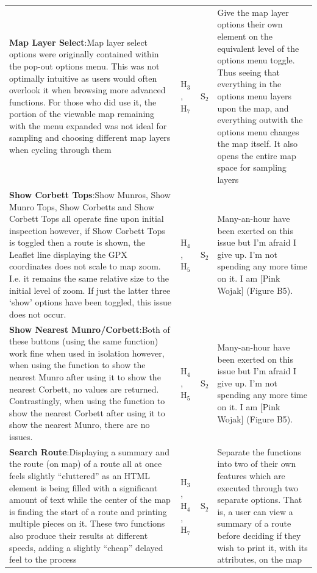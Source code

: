 \documentclass[11pt, english]{article}
\begin{document}
\begin{center}
\begin{longtable}{p{7.5cm}p{0.5cm}p{0.5cm}p{4cm}}
		\textbf{Map Layer Select}:\newline Map layer select options were originally contained within the pop-out options menu. This was not optimally intuitive as users would often overlook it when browsing more advanced functions. For those who did use it, the portion of the viewable map remaining with the menu expanded was not ideal for sampling and choosing different map layers when cycling through them & $\mathrm{H_{3}}$, $\mathrm{H_{7}}$ & $\mathrm{S_{2}}$ & Give the map layer options their own element on the equivalent level of the options menu toggle. Thus seeing that everything in the options menu layers upon the map, and everything outwith the options menu changes the map itself. It also opens the entire map space for sampling layers\\
		\textbf{Show Corbett Tops}:\newline Show Munros, Show Munro Tops, Show Corbetts and Show Corbett Tops all operate fine upon initial inspection however, if Show Corbett Tops is toggled then a route is shown, the Leaflet line displaying the GPX coordinates does not scale to map zoom. I.e. it remains the same relative size to the initial level of zoom. If just the latter three `show' options have been toggled, this issue does not occur. & $\mathrm{H_{4}}$, $\mathrm{H_{5}}$ & $\mathrm{S_{2}}$ & Many-an-hour have been exerted on this issue but I'm afraid I give up. I'm not spending any more time on it. I am [Pink Wojak] (Figure B5).\\
		\textbf{Show Nearest Munro/Corbett}:\newline Both of these buttons (using the same function) work fine when used in isolation however, when using the function to show the nearest Munro after using it to show the nearest Corbett, no values are returned. Contrastingly, when using the function to show the nearest Corbett after using it to show the nearest Munro, there are no issues. & $\mathrm{H_{4}}$, $\mathrm{H_{5}}$ & $\mathrm{S_{2}}$ & Many-an-hour have been exerted on this issue but I'm afraid I give up. I'm not spending any more time on it. I am [Pink Wojak] (Figure B5).\\
		\textbf{Search Route}:\newline Displaying a summary and the route (on map) of a route all at once feels slightly ``cluttered'' as an HTML element is being filled with a significant amount of text while the center of the map is finding the start of a route and printing multiple pieces on it. These two functions also produce their results at different speeds, adding a slightly ``cheap'' delayed feel to the process & $\mathrm{H_{3}}$, $\mathrm{H_{4}}$, $\mathrm{H_{7}}$ & $\mathrm{S_{2}}$ & Separate the functions into two of their own features which are executed through two separate options. That is, a user can view a summary of a route before deciding if they wish to print it, with its attributes, on the map\\

\end{longtable}
\end{center}
\end{document}
